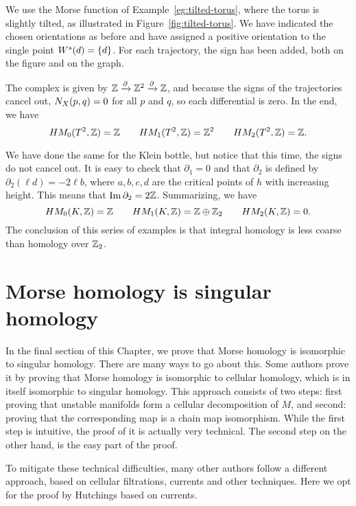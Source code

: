 \begin{eg}
    We use the Morse function of Example~\ref{eg:tilted-torus}, where the torus is slightly tilted, as illustrated in Figure~\ref{fig:tilted-torus}.
    We have indicated the chosen orientations as before and have assigned a positive orientation to the single point $\stable d = \{d\}$.
    For each trajectory, the sign has been added, both on the figure and on the graph.

    The complex is given by $\Z \xrightarrow{\partial} \Z^2 \xrightarrow{\partial}  \Z$, and because the signs of the trajectories cancel out, $\NX Xpq = 0$ for all $p$ and $q$, so each differential is zero.
    In the end, we have
    \[
        \HMf[0]{T^2, \Z} = \Z \qquad
        \HMf[1]{T^2, \Z} = \Z^2 \qquad
        \HMf[2]{T^2, \Z} = \Z
    .\] 
\end{eg}
\begin{eg}
    We have done the same for the Klein bottle, but notice that this time, the signs do not cancel out.
    It is easy to check that $\partial_1 = 0$ and that  $\partial_2$ is defined by  $\partial_2(\ell d) = -2\ell b$, where $a,b,c,d$ are the critical points of $h$ with increasing height.
    This means that $\Im \partial_2 = 2 \Z$. Summarizing, we have
    \[
        \HMf[0]{K, \Z} = \Z \qquad
        \HMf[1]{K, \Z} = \Z \oplus \Z_2 \qquad
        \HMf[2]{K, \Z} = 0
    .\] 
    The conclusion of this series of examples is that integral homology is less coarse than homology over $\Z_2$.
\end{eg}

\section{Morse homology is singular homology}

In the final section of this Chapter, we prove that Morse homology is isomorphic to singular homology.
There are many ways to go about this.
Some authors prove it by proving that Morse homology is isomorphic to cellular homology, which is in itself isomorphic to singular homology.
This approach consists of two steps: first proving that unstable manifolds form a cellular decomposition of $M$, and second: proving that the corresponding map is a chain map isomorphism.
While the first step is intuitive, the proof of it is actually very technical.
The second step on the other hand, is the easy part of the proof.

To mitigate these technical difficulties, many other authors follow a different approach, based on cellular filtrations, currents and other techniques.
Here we opt for the proof by Hutchings based on currents.

